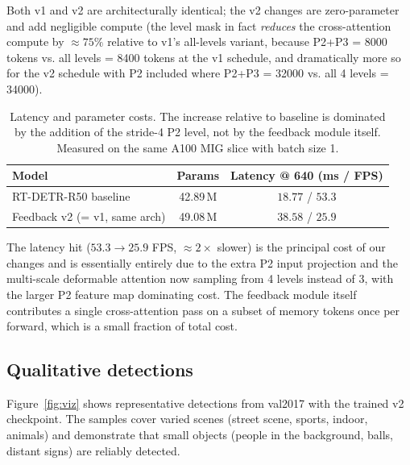 Both v1 and v2 are architecturally identical; the v2 changes are zero-parameter and add negligible compute (the level mask in fact \emph{reduces} the cross-attention compute by $\approx 75\%$ relative to v1's all-levels variant, because P2+P3 = 8000 tokens vs. all levels = 8400 tokens at the v1 schedule, and dramatically more so for the v2 schedule with P2 included where P2+P3 = 32000 vs. all 4 levels = 34000).

\begin{table}[H]
\centering
\small
\begin{tabular}{lcc}
    \toprule
    \textbf{Model} & \textbf{Params} & \textbf{Latency @ 640 (ms / FPS)} \\
    \midrule
    RT-DETR-R50 baseline~\cite{lyu2024rtdetr} & 42.89\,M & $18.77$ / $53.3$ \\
    Feedback v2 (= v1, same arch)              & 49.08\,M & $38.58$ / $25.9$ \\
    \bottomrule
\end{tabular}
\caption{Latency and parameter costs. The increase relative to baseline is dominated by the addition of the stride-4 P2 level, not by the feedback module itself. Measured on the same A100 MIG slice with batch size 1.}
\label{tab:latency}
\end{table}

The latency hit ($53.3 \to 25.9$ FPS, ${\approx}2\times$ slower) is the principal cost of our changes and is essentially entirely due to the extra P2 input projection and the multi-scale deformable attention now sampling from 4 levels instead of 3, with the larger P2 feature map dominating cost. The feedback module itself contributes a single cross-attention pass on a subset of memory tokens once per forward, which is a small fraction of total cost.

\subsection{Qualitative detections}
\label{sec:results-qualitative}

Figure~\ref{fig:viz} shows representative detections from val2017 with the trained v2 checkpoint. The samples cover varied scenes (street scene, sports, indoor, animals) and demonstrate that small objects (people in the background, balls, distant signs) are reliably detected.

